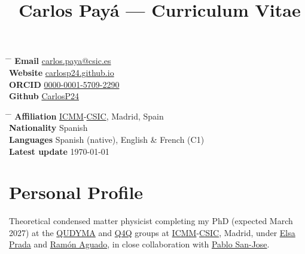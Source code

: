 \documentclass[10pt]{article} %
\begin{document}

\title{Carlos Payá — Curriculum Vitae} %


\vspace{-0.4cm}
\parbox[t]{0.5\textwidth}{ %
\begin{tabbing} %
\hspace{3cm} \= \hspace{4cm} \= \kill %
\textbf{Email} \> \href{mailto:carlos.paya@csic.es}{carlos.paya@csic.es} \\ 
\textbf{Website} \> \href{https://carlosp24.github.io}{carlosp24.github.io} \\ 
\textbf{ORCID} \> \href{https://orcid.org/0000-0001-5709-2290}{0000-0001-5709-2290} \\ 
\textbf{Github} \> \href{https://github.com/CarlosP24}{CarlosP24} 
\end{tabbing}}
\hfill %
\parbox[t]{0.5\textwidth}{ %
\begin{tabbing} %
\hspace{3cm} \= \hspace{4cm} \= \kill %
\textbf{Affiliation} \> \href{https://www.icmm.csic.es/}{ICMM}-\href{https://www.csic.es/en}{CSIC}, Madrid, Spain \\
\textbf{Nationality} \> Spanish \\
\textbf{Languages} \> Spanish (native), English \& French (C1) \\
\textbf{Latest update} \> \today \\
\end{tabbing}}
\vspace{-0.4cm}


\section{Personal Profile}
Theoretical condensed matter physicist completing my PhD (expected March 2027) at the \href{https://sites.google.com/view/qudyma-icmm}{QUDYMA} and \href{https://wp.icmm.csic.es/tqe/}{Q4Q} groups at \href{https://www.icmm.csic.es/}{ICMM}-\href{https://www.csic.es/en}{CSIC}, Madrid, under \href{https://elsaprada.github.io/}{Elsa Prada} and \href{https://wp.icmm.csic.es/tqe/people/ramon-aguado/}{Ramón Aguado}, in close collaboration with \href{https://pablosanjose.github.io/}{Pablo San-Jose}.
\end{document}
